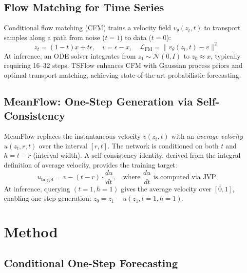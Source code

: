 \documentclass{article}
\begin{document}
\subsection{Flow Matching for Time Series}

Conditional flow matching (CFM) \citep{lipman2023flow, tong2024otcfm} trains a velocity field $v_\theta(z_t, t)$ to transport samples along a path from noise ($t=1$) to data ($t=0$):
\begin{equation}
    z_t = (1-t) x + t \epsilon, \quad v = \epsilon - x, \quad \mathcal{L}_{\text{FM}} = \|v_\theta(z_t, t) - v\|^2
\end{equation}
At inference, an ODE solver integrates from $z_1 \sim \mathcal{N}(0, I)$ to $z_0 \approx x$, typically requiring 16--32 steps. TSFlow \citep{kollovieh2024tsflow} enhances CFM with Gaussian process priors and optimal transport matching, achieving state-of-the-art probabilistic forecasting.

\subsection{MeanFlow: One-Step Generation via Self-Consistency}

MeanFlow \citep{geng2025meanflow} replaces the instantaneous velocity $v(z_t, t)$ with an \emph{average velocity} $u(z_t, r, t)$ over the interval $[r, t]$. The network is conditioned on both $t$ and $h = t - r$ (interval width). A self-consistency identity, derived from the integral definition of average velocity, provides the training target:
\begin{equation}
    u_{\text{target}} = v - (t - r) \cdot \frac{du}{dt}, \quad \text{where } \frac{du}{dt} \text{ is computed via JVP}
\end{equation}
At inference, querying $(t=1, h=1)$ gives the average velocity over $[0, 1]$, enabling one-step generation: $z_0 = z_1 - u(z_1, t\!=\!1, h\!=\!1)$.

\section{Method}

\subsection{Conditional One-Step Forecasting}
\end{document}
